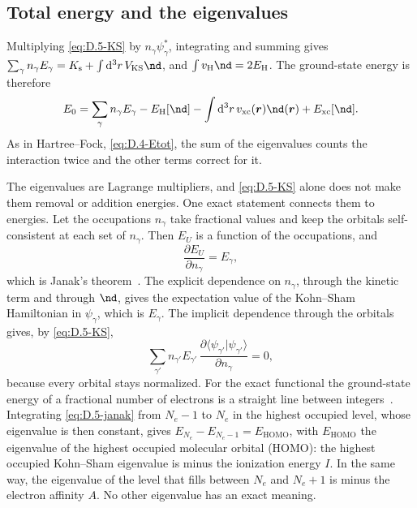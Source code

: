 \subsection*{Total energy and the eigenvalues}

Multiplying \cref{eq:D.5-KS} by $n_\gamma\psi^*_\gamma$, integrating and summing gives $\sum_\gamma n_\gamma E_\gamma = K_{\mathrm{s}} + \int\dd^3r\,V_{\mathrm{KS}}\nd$, and $\int v_{\mathrm{H}}\nd = 2E_{\mathrm{H}}$. The ground-state energy is therefore
\begin{equation}
  E_0 = \sum_\gamma n_\gamma E_\gamma - E_{\mathrm{H}}[\nd] - \int\dd^3r\,v_{\mathrm{xc}}(\vect{r})\nd(\vect{r}) + E_{\mathrm{xc}}[\nd] .
  \label{eq:D.5-Etot}
\end{equation}
As in Hartree--Fock, \cref{eq:D.4-Etot}, the sum of the eigenvalues counts the interaction twice and the other terms correct for it.

The eigenvalues are Lagrange multipliers, and \cref{eq:D.5-KS} alone does not make them removal or addition energies. One exact statement connects them to energies. Let the occupations $n_\gamma$ take fractional values and keep the orbitals self-consistent at each set of $n_\gamma$. Then $E_U$ is a function of the occupations, and
\begin{equation}
  \frac{\partial E_U}{\partial n_\gamma} = E_\gamma ,
  \label{eq:D.5-janak}
\end{equation}
which is Janak's theorem~\cite{janak1978proof}. The explicit dependence on $n_\gamma$, through the kinetic term and through $\nd$, gives the expectation value of the Kohn--Sham Hamiltonian in $\psi_\gamma$, which is $E_\gamma$. The implicit dependence through the orbitals gives, by \cref{eq:D.5-KS},
\begin{equation*}
  \sum_{\gamma'}n_{\gamma'}E_{\gamma'}\,\frac{\partial\langle\psi_{\gamma'}|\psi_{\gamma'}\rangle}{\partial n_\gamma} = 0 ,
\end{equation*}
because every orbital stays normalized. For the exact functional the ground-state energy of a fractional number of electrons is a straight line between integers~\cite{perdew1982density}. Integrating \cref{eq:D.5-janak} from $N_e - 1$ to $N_e$ in the highest occupied level, whose eigenvalue is then constant, gives $E_{N_e} - E_{N_e-1} = E_{\mathrm{HOMO}}$, with $E_{\mathrm{HOMO}}$ the eigenvalue of the highest occupied molecular orbital (HOMO): the highest occupied Kohn--Sham eigenvalue is minus the ionization energy $I$. In the same way, the eigenvalue of the level that fills between $N_e$ and $N_e + 1$ is minus the electron affinity $A$. No other eigenvalue has an exact meaning.


